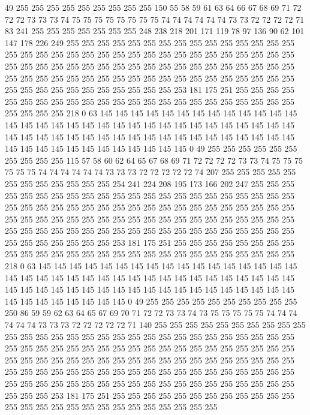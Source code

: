 49 255 255 255 255 255 255 255 255 255 150 55 58 59 61 63 64 66 67 68
69 71 72 72 72 73 73 73 74 75 75 75 75 75 75 75 75 74 74 74
74 74 74 73 73 72 72 72 72 71 83 241 255 255 255 255 255 255 255 248
238 218 201 171 119 78 97 136 90 62 101 147 178 226 249 255 255 255 255 255
255 255 255 255 255 255 255 255 255 255 255 255 255 255 255 255 255 255 255 255
255 255 255 255 255 255 255 255 255 255 255 255 255 255 255 255 255 255 255 255
255 255 255 255 255 255 255 255 255 255 255 255 255 255 255 255 255 255 255 255
255 255 255 255 255 255 255 255 255 255 255 255 255 255 255 255 255 255 253 181
175 251 255 255 255 255 255 255 255 255 255 255 255 255 255 255 255 255 255 255
255 255 255 255 255 255 255 255 255 218 0 63 145 145 145 145 145 145 145 145
145 145 145 145 145 145 145 145 145 145 145 145 145 145 145 145 145 145 145 145
145 145 145 145 145 145 145 145 145 145 145 145 145 145 145 145 145 145 145 145
145 145 145 145 145 145 145 145 145 145 145 145 145 145 145 0 49 255 255 255
255 255 255 255 255 255 255 115 57 58 60 62 64 65 67 68 69 71 72 72
72 72 73 73 74 75 75 75 75 75 75 74 74 74 74 74 74 73 73 73
72 72 72 72 72 74 207 255 255 255 255 255 255 255 255 255 255 255 255 254
241 224 208 195 173 166 202 247 255 255 255 255 255 255 255 255 255 255 255 255
255 255 255 255 255 255 255 255 255 255 255 255 255 255 255 255 255 255 255 255
255 255 255 255 255 255 255 255 255 255 255 255 255 255 255 255 255 255 255 255
255 255 255 255 255 255 255 255 255 255 255 255 255 255 255 255 255 255 255 255
255 255 255 255 255 255 255 255 255 255 255 255 255 255 253 181 175 251 255 255
255 255 255 255 255 255 255 255 255 255 255 255 255 255 255 255 255 255 255 255
255 255 255 255 255 218 0 63 145 145 145 145 145 145 145 145 145 145 145 145
145 145 145 145 145 145 145 145 145 145 145 145 145 145 145 145 145 145 145 145
145 145 145 145 145 145 145 145 145 145 145 145 145 145 145 145 145 145 145 145
145 145 145 145 145 145 145 145 145 145 145 0 49 255 255 255 255 255 255 255
255 255 255 250 86 59 59 62 63 64 65 67 69 70 71 72 72 73 73 74
73 75 75 75 75 75 74 74 74 74 74 74 73 73 73 72 72 72 72 72
71 140 255 255 255 255 255 255 255 255 255 255 255 255 255 255 255 255 255 255
255 255 255 255 255 255 255 255 255 255 255 255 255 255 255 255 255 255 255 255
255 255 255 255 255 255 255 255 255 255 255 255 255 255 255 255 255 255 255 255
255 255 255 255 255 255 255 255 255 255 255 255 255 255 255 255 255 255 255 255
255 255 255 255 255 255 255 255 255 255 255 255 255 255 255 255 255 255 255 255
255 255 255 255 255 255 255 255 255 255 253 181 175 251 255 255 255 255 255 255
255 255 255 255 255 255 255 255 255 255 255 255 255 255 255 255 255 255 255 255
